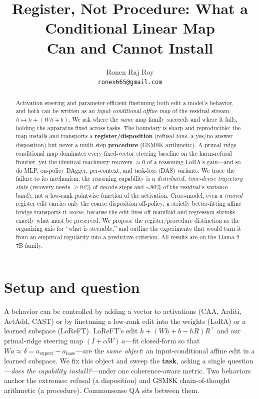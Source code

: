\documentclass{article}
\title{Register, Not Procedure: What a Conditional Linear Map\\Can and Cannot Install}
\author{%
  Ronen Raj Roy\\
  \texttt{ronex665@gmail.com}\\
}
\begin{document}
\maketitle

\begin{abstract}
Activation steering and parameter-efficient finetuning both edit a model's behavior, and both can be
written as an \emph{input-conditional affine map} of the residual stream, $h \mapsto h + (Wh + b)$. We
ask where the \emph{same} map family succeeds and where it fails, holding the apparatus fixed across
tasks. The boundary is sharp and reproducible: the map installs and transports a
\textbf{register/disposition} (refusal \emph{tone}, a yes/no answer disposition) but never a
multi-step \textbf{procedure} (GSM8K arithmetic). A primal-ridge conditional map dominates every
fixed-vector steering baseline on the harm-refusal frontier, yet the identical machinery recovers
$\approx 0$ of a reasoning LoRA's gain---and so do MLP, on-policy DAgger, per-context, and task-loss
(DAS) variants. We trace the failure to its mechanism: the reasoning capability is a \emph{distributed,
time-dense trajectory state} (recovery needs ${\geq}94\%$ of decode steps and ${\sim}80\%$ of the
residual's variance band), not a low-rank pointwise function of the activation. Cross-model, even a
\emph{trained} register edit carries only the coarse disposition off-policy; a strictly better-fitting
affine bridge transports it \emph{worse}, because the edit lives off-manifold and regression shrinks
exactly what must be preserved. We propose the register/procedure distinction as the organizing axis
for ``what is steerable,'' and outline the experiments that would turn it from an empirical regularity
into a predictive criterion. All results are on the Llama-2-7B family.
\end{abstract}

\section{Setup and question}

A behavior can be controlled by adding a vector to activations (CAA, Arditi, ActAdd, CAST) or by
finetuning a low-rank edit into the weights (LoRA) or a learned subspace (LoReFT). LoReFT's edit
$h + (Wh + b - hR)R^{\top}$ and our primal-ridge steering map $(I + \alpha W)\,a$---fit closed-form so
that $W a \approx \delta = a_{\text{expert}} - a_{\text{base}}$---are the \emph{same object}: an
input-conditional affine edit in a learned subspace. We fix this object and sweep the \textbf{task},
asking a single question---\emph{does the capability install?}---under one coherence-aware metric. Two
behaviors anchor the extremes: refusal (a disposition) and GSM8K chain-of-thought arithmetic (a
procedure). Commonsense QA sits between them.
\end{document}
